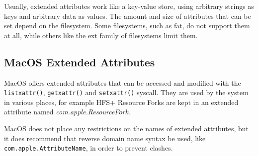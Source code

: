 \documentclass[a4paper]{article}
\begin{document}
Usually, extended attributes work like a key-value store, using arbitrary strings as keys and arbitrary data as values. The amount and size of attributes that can be set depend on the filesystem. Some filesystems, such as \gls{fat}, do not support them at all, while others like the \gls{ext} family of filesystems limit them.



\subsection{MacOS Extended Attributes}


MacOS offers extended attributes that can be accessed and modified with the \verb|listxattr()|, \verb|getxattr()| and \verb|setxattr()| syscall. They are used by the system in various places, for example HFS+ Resource Forks are kept in an extended attribute named \emph{com.apple.ResourceFork}. 

MacOS does not place any restrictions on the names of extended attributes, but it does recommend that reverse domain name syntax be used, like \verb|com.apple.AttributeName|, in order to prevent clashes.
\end{document}
